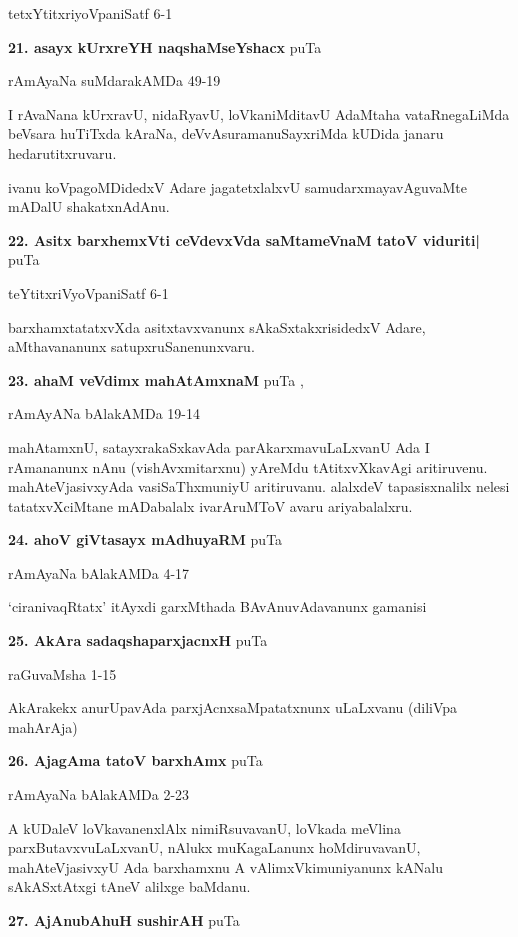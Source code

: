 \hfill tetxYtitxriyoVpaniSatf 6-1

\medskip
\noindent\textbf{21. asayx kUrxreYH naqshaMseYshacx} \hfill puTa \pageref{192a}

\hfill rAmAyaNa suMdarakAMDa 49-19

I rAvaNana kUrxravU, nidaRyavU, loVkaniMditavU AdaMtaha vataRnegaLiMda beVsara huTiTxda kAraNa, deVvAsuramanuSayxriMda kUDida janaru hedarutitxruvaru.

ivanu koVpagoMDidedxV Adare jagatetxlalxvU samudarxmayavAguvaMte mADalU shakatxnAdAnu.

\medskip
\noindent\textbf{22. Asitx barxhemxVti ceVdevxVda saMtameVnaM tatoV viduriti|} \hfill puTa \pageref{24}

\hfill teYtitxriVyoVpaniSatf 6-1

barxhamxtatatxvXda asitxtavxvanunx sAkaSxtakxrisidedxV Adare, aMthavananunx satupxruSanenunxvaru.

\medskip
\noindent\textbf{23. ahaM veVdimx mahAtAmxnaM} \hfill puTa \pageref{195},\pageref{251a}

\hfill rAmAyANa bAlakAMDa 19-14

mahAtamxnU, satayxrakaSxkavAda parAkarxmavuLaLxvanU Ada I rAmananunx nAnu (vishAvxmitarxnu) yAreMdu tAtitxvXkavAgi aritiruvenu. mahAteVjasivxyAda vasiSaThxmuniyU aritiruvanu. alalxdeV tapasisxnalilx nelesi tatatxvXciMtane mADabalalx ivarAruMToV avaru ariyabalalxru. 

\medskip
\noindent\textbf{24. ahoV giVtasayx mAdhuyaRM} \hfill puTa \pageref{159}

\hfill rAmAyaNa bAlakAMDa 4-17

`ciranivaqRtatx' itAyxdi garxMthada BAvAnuvAdavanunx gamanisi

\medskip
\noindent\textbf{25. AkAra sadaqshaparxjacnxH} \hfill puTa \pageref{139a}

\hfill raGuvaMsha 1-15

AkArakekx anurUpavAda parxjAcnxsaMpatatxnunx uLaLxvanu (diliVpa mahArAja)

\medskip
\noindent\textbf{26. AjagAma tatoV barxhAmx} \hfill puTa \pageref{202}

\hfill rAmAyaNa bAlakAMDa 2-23

A kUDaleV loVkavanenxlAlx nimiRsuvavanU, loVkada meVlina parxButavxvuLaLxvanU, nAlukx muKagaLanunx hoMdiruvavanU, mahAteVjasivxyU Ada barxhamxnu A vAlimxVkimuniyanunx kANalu sAkASxtAtxgi tAneV alilxge baMdanu.

\medskip
\noindent\textbf{27. AjAnubAhuH sushirAH} \hfill puTa \pageref{247}

